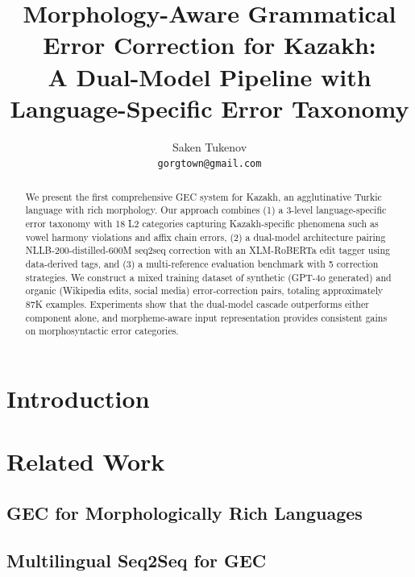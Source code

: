 \documentclass[11pt]{article}
\title{Morphology-Aware Grammatical Error Correction for Kazakh: \\
A Dual-Model Pipeline with Language-Specific Error Taxonomy}
\author{Saken Tukenov \\
\texttt{gorgtown@gmail.com}}
\date{}
\begin{document}
\maketitle

\begin{abstract}
We present the first comprehensive GEC system for Kazakh, an agglutinative Turkic language with rich morphology.
Our approach combines (1) a 3-level language-specific error taxonomy with 18 L2 categories capturing Kazakh-specific
phenomena such as vowel harmony violations and affix chain errors, (2) a dual-model architecture pairing
NLLB-200-distilled-600M seq2seq correction with an XLM-RoBERTa edit tagger using data-derived tags, and
(3) a multi-reference evaluation benchmark with 5 correction strategies.
We construct a mixed training dataset of synthetic (GPT-4o generated) and organic (Wikipedia edits, social media)
error-correction pairs, totaling approximately 87K examples.
Experiments show that the dual-model cascade outperforms either component alone, and morpheme-aware input
representation provides consistent gains on morphosyntactic error categories.
\end{abstract}

\section{Introduction}
\label{sec:intro}


\section{Related Work}
\label{sec:related}

\subsection{GEC for Morphologically Rich Languages}

\subsection{Multilingual Seq2Seq for GEC}
\end{document}
